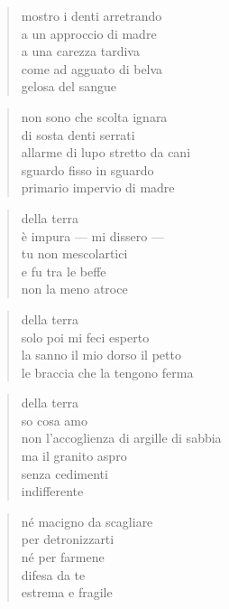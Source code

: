 \clearpage


\begin{verse}
    mostro i denti arretrando\\
    a un approccio di madre\\
    a una carezza tardiva\\
    come ad agguato di belva\\
    gelosa del sangue
\end{verse}

\begin{verse}
    non sono che scolta ignara\\
    di sosta denti serrati\\
    allarme di lupo stretto da cani\\
    sguardo fisso in sguardo\\
    primario impervio di madre
\end{verse}

\clearpage


\begin{verse}
    della terra\\
    è impura — mi dissero —\\
    tu non mescolartici\\
    e fu tra le beffe\\
    non la meno atroce
\end{verse}

\begin{verse}
    della terra\\
    solo poi mi feci esperto\\
    la sanno il mio dorso il petto\\
    le braccia che la tengono ferma
\end{verse}

\begin{verse}
    della terra\\
    so cosa amo\\
    non l'accoglienza di argille di sabbia\\
    ma il granito aspro\\
    senza cedimenti\\
    indifferente
\end{verse}

\clearpage


\begin{verse}
    né macigno da scagliare\\
    per detronizzarti\\
    né per farmene\\
    difesa da te\\
    estrema e fragile
\end{verse}

